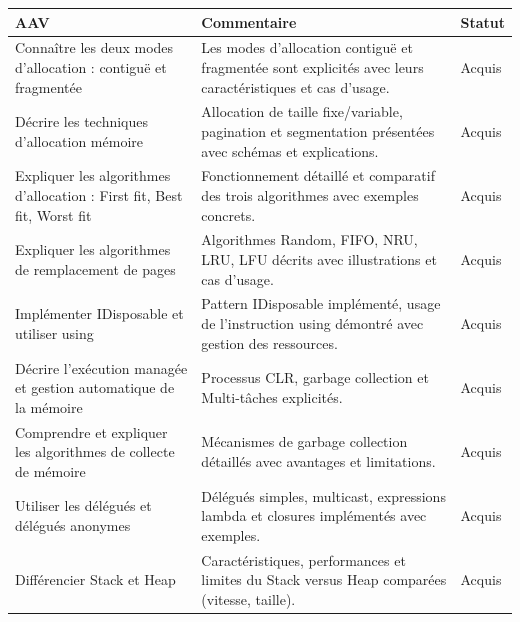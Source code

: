 \begin{center}
\setlength{\tabcolsep}{10pt}

\begin{tabular}{|p{}|p{}|m{}|}
\hline
\textbf{AAV} & \textbf{Commentaire} & \textbf{Statut} \\ \hline

Connaître les deux modes d'allocation : contiguë et fragmentée &
Les modes d'allocation contiguë et fragmentée sont explicités avec leurs caractéristiques et cas d'usage. &
{\color{green!60!black}Acquis} \\ \hline

Décrire les techniques d'allocation mémoire &
Allocation de taille fixe/variable, pagination et segmentation présentées avec schémas et explications. &
{\color{green!60!black}Acquis} \\ \hline

Expliquer les algorithmes d'allocation : First fit, Best fit, Worst fit &
Fonctionnement détaillé et comparatif des trois algorithmes avec exemples concrets. &
{\color{green!60!black}Acquis} \\ \hline

Expliquer les algorithmes de remplacement de pages &
Algorithmes Random, FIFO, NRU, LRU, LFU décrits avec illustrations et cas d'usage. &
{\color{green!60!black}Acquis} \\ \hline

Implémenter IDisposable et utiliser using &
Pattern IDisposable implémenté, usage de l'instruction using démontré avec gestion des ressources. &
{\color{green!60!black}Acquis} \\ \hline

Décrire l'exécution managée et gestion automatique de la mémoire &
Processus CLR, garbage collection et Multi-tâches explicités. &
{\color{green!60!black}Acquis} \\ \hline

Comprendre et expliquer les algorithmes de collecte de mémoire &
Mécanismes de garbage collection détaillés avec avantages et limitations. &
{\color{green!60!black}Acquis} \\ \hline

Utiliser les délégués et délégués anonymes &
Délégués simples, multicast, expressions lambda et closures implémentés avec exemples. &
{\color{green!60!black}Acquis} \\ \hline

Différencier Stack et Heap &
Caractéristiques, performances et limites du Stack versus Heap comparées (vitesse, taille). &
{\color{green!60!black}Acquis} \\ \hline


\end{tabular}
\end{center}
